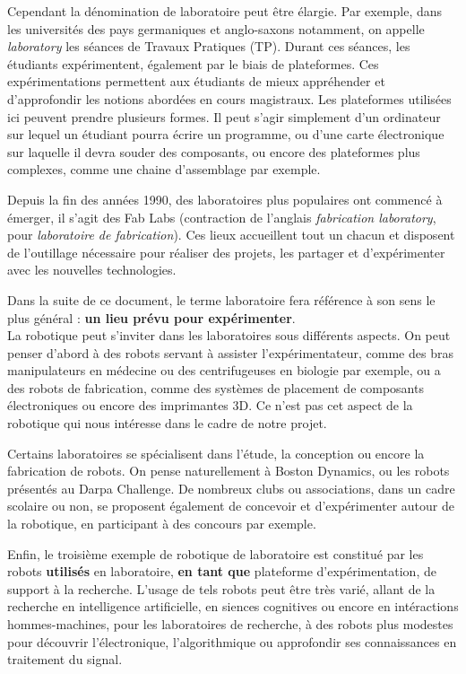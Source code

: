 \documentclass[a4paper,12pt]{report}
\begin{document}
Cependant la dénomination de laboratoire peut être élargie. 
Par exemple, dans les universités des pays germaniques et anglo-saxons notamment, on appelle \emph{laboratory} les séances de Travaux Pratiques (TP).
Durant ces séances, les étudiants expérimentent, également par le biais de plateformes.
Ces expérimentations permettent aux étudiants de mieux appréhender et d'approfondir les notions abordées en cours magistraux.
Les plateformes utilisées ici peuvent prendre plusieurs formes.
Il peut s'agir simplement d'un ordinateur sur lequel un étudiant pourra écrire un programme, 
ou d'une carte électronique sur laquelle il devra souder des composants, ou encore des plateformes plus complexes, comme une chaine d'assemblage par exemple.

Depuis la fin des années 1990, des laboratoires plus populaires ont commencé à émerger,
il s'agit des Fab Labs (contraction de l'anglais \emph{fabrication laboratory}, pour \emph{laboratoire de fabrication}).
Ces lieux accueillent tout un chacun et disposent de l'outillage nécessaire pour réaliser des projets, les partager et d'expérimenter avec les nouvelles technologies.

Dans la suite de ce document, le terme laboratoire fera référence à son sens le plus général : \textbf{un lieu prévu pour expérimenter}.\\

La robotique peut s'inviter dans les laboratoires sous différents aspects.
On peut penser d'abord à des robots servant à assister l'expérimentateur, comme des bras manipulateurs en médecine ou des centrifugeuses en biologie par exemple, 
ou a des robots de fabrication, comme des systèmes de placement de composants électroniques ou encore des imprimantes 3D.
Ce n'est pas cet aspect de la robotique qui nous intéresse dans le cadre de notre projet.

Certains laboratoires se spécialisent dans l'étude, la conception ou encore la fabrication de robots.
On pense naturellement à Boston Dynamics, ou les robots présentés au Darpa Challenge. 
De nombreux clubs ou associations, dans un cadre scolaire ou non, se proposent également de concevoir et d'expérimenter autour de la robotique, 
en participant à des concours par exemple.

Enfin, le troisième exemple de robotique de laboratoire est constitué par les robots \textbf{utilisés} en laboratoire, 
\textbf{en tant que} plateforme d'expérimentation, de support à la recherche.
L'usage de tels robots peut être très varié, allant de la recherche en intelligence artificielle, 
en siences cognitives ou encore en intéractions hommes-machines, pour les laboratoires de recherche, 
à des robots plus modestes pour découvrir l'électronique, l'algorithmique ou approfondir ses connaissances en traitement du signal.
\end{document}

